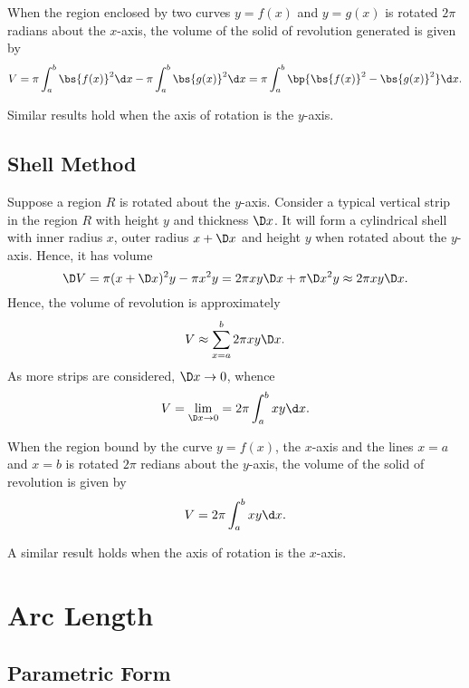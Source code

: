 \begin{proposition}
    When the region enclosed by two curves $y = f(x)$ and $y = g(x)$ is rotated $2\pi$ radians about the $x$-axis, the volume of the solid of revolution generated is given by \[V = \pi \int_a^b \bs{f(x)}^2 \d x - \pi \int_a^b \bs{g(x)}^2 \d x = \pi \int_a^b \bp{\bs{f(x)}^2 - \bs{g(x)}^2} \d x.\]
\end{proposition}

Similar results hold when the axis of rotation is the $y$-axis.

\subsection{Shell Method}

Suppose a region $R$ is rotated about the $y$-axis. Consider a typical vertical strip in the region $R$ with height $y$ and thickness $\D x$. It will form a cylindrical shell with inner radius $x$, outer radius $x + \D x$ and height $y$ when rotated about the $y$-axis. Hence, it has volume \[\D V = \pi (x + \D x)^2 y - \pi x^2 y = 2 \pi xy \D x + \pi \D x^2 y \approx 2 \pi xy \D x.\] Hence, the volume of revolution is approximately \[V \approx \sum_{x = a}^b 2 \pi xy \D x.\] As more strips are considered, $\D x \to 0$, whence \[V = \lim_{\D x \to 0} = 2\pi \int_a^b xy \d x.\]

\begin{proposition}
    When the region bound by the curve $y = f(x)$, the $x$-axis and the lines $x = a$ and $x = b$ is rotated $2\pi$ redians about the $y$-axis, the volume of the solid of revolution is given by \[V = 2\pi \int_a^b xy \d x.\]
\end{proposition}

A similar result holds when the axis of rotation is the $x$-axis.

\section{Arc Length}

\subsection{Parametric Form}

